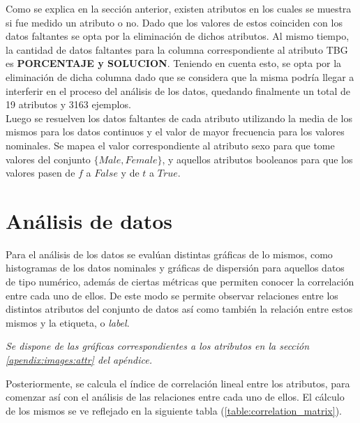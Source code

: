 \documentclass[osajnl,twocolumn,showpacs,superscriptaddress,10pt,floatfix]{revtex4-1} %
\begin{document}
Como se explica en la sección anterior, existen atributos en los cuales se muestra si fue medido un atributo o no. Dado que los valores de estos coinciden con los datos faltantes se opta por la eliminación de dichos atributos. Al mismo tiempo, la cantidad de datos faltantes para la columna correspondiente al atributo TBG es \textbf{PORCENTAJE y SOLUCION}. Teniendo en cuenta esto, se opta por la eliminación de dicha columna dado que se considera que la misma podría llegar a interferir en el proceso del análisis de los datos, quedando finalmente un total de 19 atributos y 3163 ejemplos. \\

Luego se resuelven los datos faltantes de cada atributo utilizando la media de los mismos para los datos continuos y el valor de mayor frecuencia para los valores nominales. Se mapea el valor correspondiente al atributo sexo para que tome valores del conjunto $\{Male, Female\}$, y aquellos atributos booleanos para que los valores pasen de $f$ a $False$ y de $t$ a $True$. \\

\section{Análisis de datos}

Para el análisis de los datos se evalúan distintas gráficas de lo mismos, como histogramas de los datos nominales y gráficas de dispersión para aquellos datos de tipo numérico, además de ciertas métricas que permiten conocer la correlación entre cada uno de ellos. De este modo se permite observar relaciones entre los distintos atributos del conjunto de datos así como también la relación entre estos mismos y la etiqueta, o \textit{label}.

\begin{flushright}
\textit{\footnotesize Se dispone de las gráficas correspondientes a los atributos en la sección \ref{apendix:images:attr} del apéndice.}
\end{flushright}

Posteriormente, se calcula el índice de correlación lineal entre los atributos, para comenzar así con el análisis de las relaciones entre cada uno de ellos. El cálculo de los mismos se ve reflejado en la siguiente tabla (\ref{table:correlation_matrix}). \\
\end{document}
